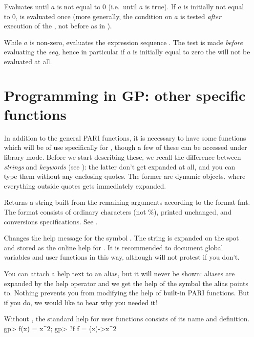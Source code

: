 \label{se:until}
Evaluates  until $a$ is not
equal to 0 (i.e.~until $a$ is true). If $a$ is initially not equal to 0,
 is evaluated once (more generally, the condition on $a$ is tested
\emph{after} execution of the , not before as in ).

\label{se:while}
While $a$ is non-zero, evaluates the expression sequence . The
test is made \emph{before} evaluating the $seq$, hence in particular if $a$
is initially equal to zero the  will not be evaluated at all.

\section{Programming in GP: other specific functions}
\label{se:gp_program}

  In addition to the general PARI functions, it is necessary to have some
functions which will be of use specifically for , though a few of these can
be accessed under library mode. Before we start describing these, we recall
the difference between \emph{strings} and \emph{keywords} (see
): the latter don't get expanded at all, and you can type
them without any enclosing quotes. The former are dynamic objects, where
everything outside quotes gets immediately expanded.


\label{se:Strprintf}
Returns a string built from the remaining arguments according to the
format fmt. The format consists of ordinary characters (not \%), printed
unchanged, and conversions specifications. See .

\label{se:addhelp}
Changes the help message for the symbol . The string 
is expanded on the spot and stored as the online help for . It is
recommended to document global variables and user functions in this way,
although  will not protest if you don't.

You can attach a help text to an alias, but it will never be
shown: aliases are expanded by the  help operator and we get the help
of the symbol the alias points to. Nothing prevents you from modifying the
help of built-in PARI functions. But if you do, we would like to hear why you
needed it!

Without , the standard help for user functions consists of its
name and definition.
\bprog
gp> f(x) = x^2;
gp> ?f
f =
  (x)->x^2

